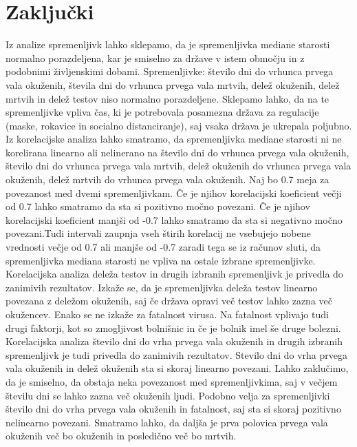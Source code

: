 \documentclass[a4paper,11pt]{article}
\begin{document}
\section{Zaključki}
Iz analize spremenljivk lahko sklepamo, da je spremenljivka mediane starosti normalno porazdeljena, kar je smiselno za države v istem območju in z podobnimi življenskimi dobami. Spremenljivke: število dni do vrhunca prvega vala okuženih, števila dni do vrhunca prvega vala mrtvih, delež okuženih, delež mrtvih in delež testov niso normalno porazdeljene. Sklepamo lahko, da na te spremenljivke vpliva čas, ki je potrebovala posamezna država za regulacije (maske, rokavice in socialno distanciranje), saj vsaka država je ukrepala poljubno. \\
Iz korelacijske analiza lahko smatramo, da spremenljivka mediane starosti ni ne korelirana linearno ali nelinerano na število dni do vrhunca prvega vala okuženih, število dni do vrhunca prvega vala mrtvih, delež okuženih do vrhunca prvega vala okuženih, delež mrtvih do vrhunca prvega vala okuženih. Naj bo 0.7 meja za povezanost med dvemi spremenljivkam. Če je njihov korelacijski koeficient večji od 0.7 lahko smatramo da sta si pozitivno močno povezani. Če je njihov korelacijski koeficient manjši od -0.7 lahko smatramo da sta si negativno močno povezani.Tudi intervali zaupnja vseh štirih korelacij ne vsebujejo nobene vrednosti večje od 0.7 ali manjše od -0.7 zaradi tega se iz računov sluti, da spremenljivka mediana starosti ne vpliva na ostale izbrane spremenljivke. \\
Korelacijska analiza deleža testov in drugih izbranih spremenljivk je privedla do zanimivih rezultatov. Izkaže se, da je spremenljivka deleža testov linearno povezana z deležom okuženih, saj če država opravi več testov lahko zazna več okužencev. Enako se ne izkaže za fatalnost virusa. Na fatalnost vplivajo tudi drugi faktorji, kot so zmogljivost bolnišnic in če je bolnik imel še druge bolezni. \\
Korelacijska analiza število dni do vrha prvega vala okuženih in drugih izbranih spremenljivk je tudi privedla do zanimivih rezultatov. Stevilo dni do vrha prvega vala okuženih in delež okuženih sta si skoraj linearno povezani. Lahko zaklučimo, da je smiselno, da obstaja neka povezanost med spremenljivkima, saj v večjem številu dni se lahko zazna več okuženih ljudi. Podobno velja za spremenljivki število dni do vrha prvega vala okuženih in fatalnost, saj sta si skoraj pozitivno nelinearno povezani. Smatramo lahko, da daljša je prva polovica prvega vala okuženih več bo okuženih in posledično več bo mrtvih.
\end{document}
